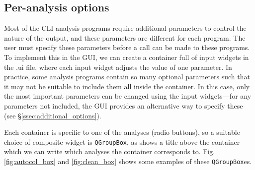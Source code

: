 \documentclass[12pt]{article}
\begin{document}
\subsection{Per-analysis options}\label{ssec:per_analysis}

Most of the CLI analysis programs require additional parameters to control the nature of the output, and these parameters are different for each program. The user must specify these parameters before a call can be made to these programs. To implement this in the GUI, we can create a container full of input widgets in the .ui file, where each input widget adjusts the value of one parameter. In practice, some analysis programs contain so many optional parameters such that it may not be suitable to include them all inside the container. In this case, only the most important parameters can be changed using the input widgets---for any parameters not included, the GUI provides an alternative way to specify these (see \S\ref{ssec:additional_options}).

Each container is specific to one of the analyses (radio buttons), so a suitable choice of composite widget is \texttt{QGroupBox}, as shows a title above the container which we can write which analyses the container corresponds to. Fig. \ref{fig:autocol_box} and \ref{fig:clean_box} shows some examples of these \texttt{QGroupBox}es. 
\end{document}
